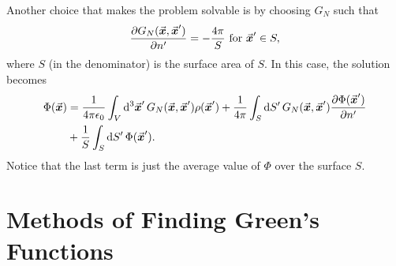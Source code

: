 Another choice that makes the problem solvable is by choosing $G_{N}$ such that
\begin{align}
    \pdv{G_{N}(\va*{x},\va*{x}')}{n'} = -\frac{4 \pi}{S} ~{\rm for}~\va*{x}' \in S
,\end{align}
where $S$ (in the denominator) is the surface area of $S$.
In this case, the solution becomes
\begin{align}
    \Phi(\va*{x}) &= \frac{1}{4 \pi \epsilon_0} \int_{V} \dd[3]{\va*{x}'} G_{N}(\va*{x},\va*{x}') \rho(\va*{x}') + \frac{1}{4 \pi} \int_{S} \dd{S'} G_{N}(\va*{x},\va*{x}') \pdv{\Phi(\va*{x}')}{n'} \\
                  &+ \frac{1}{S} \int_{S} \dd{S'} \Phi(\va*{x}')
.\end{align}
Notice that the last term is just the average value of $\Phi$ over the surface $S$.

\section{Methods of Finding Green's Functions}

